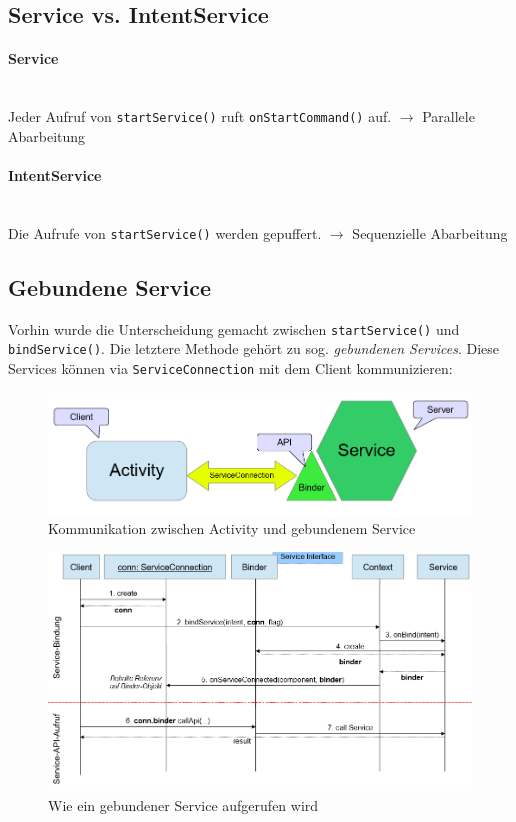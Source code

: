 \documentclass[a4paper, 11pt]{article}
\newcommand{\code}[1]{\texttt{#1}}
\begin{document}
\subsection{Service vs. IntentService}
\begin{multicols}{2}
	\paragraph{Service}\mbox{}\\
	Jeder Aufruf von \code{startService()} ruft \code{onStartCommand()} auf. $\rightarrow$ Parallele Abarbeitung
\columnbreak
	\paragraph{IntentService}\mbox{}\\
	Die Aufrufe von \code{startService()} werden gepuffert. $\rightarrow$ Sequenzielle Abarbeitung
\end{multicols}

\subsection{Gebundene Service}
Vorhin wurde die Unterscheidung gemacht zwischen \code{startService()} und \code{bindService()}. Die letztere Methode gehört zu sog. \textit{gebundenen Services}. Diese Services können via \code{ServiceConnection} mit dem Client kommunizieren:

\begin{figure}[htb]
	\centering
	\includegraphics[keepaspectratio=true,height=10\baselineskip]{boundService.PNG}
	\caption{Kommunikation zwischen Activity und gebundenem Service}
	\label{fig:BoundService}
\end{figure}

\begin{figure}[htb]
	\centering
	\includegraphics[keepaspectratio=true,height=15\baselineskip]{ablaufBindService.PNG}
	\caption{Wie ein gebundener Service aufgerufen wird}
	\label{fig:ablaufBoundService}
\end{figure}
\end{document}
